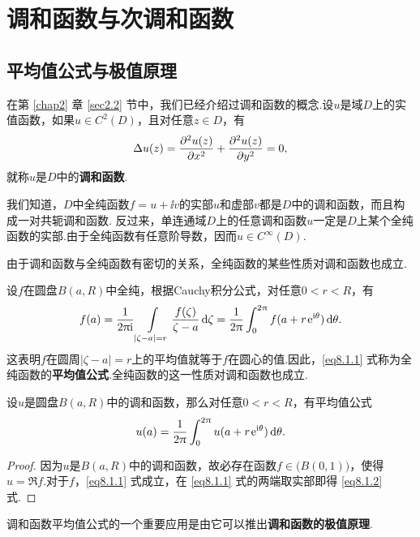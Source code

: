 \chapter{调和函数与次调和函数\label{chap8}}
\section{平均值公式与极值原理\label{sec8.1}}
在第 \ref{chap2} 章 \ref{sec2.2} 节中，我们已经介绍过调和函数的概念.设$u$是域$D$上的实值函数，如果$u\in C^2(D)$，且对任意$z\in D$，有
\[
  \Delta u(z) = \frac{\partial^2 u(z)}{\partial x^2} + \frac{\partial^2 u(z)}{\partial y^2} = 0,
\]
就称$u$是$D$中的\textbf{调和函数}.

我们知道，$D$中全纯函数$f=u+\ii v$的实部$u$和虚部$v$都是$D$中的调和函数，而且构成一对共轭调和函数. 反过来，单连通域$D$上的任意调和函数$u$一定是$D$上某个全纯函数的实部.由于全纯函数有任意阶导数，因而$u\in C^\infty(D)$.

由于调和函数与全纯函数有密切的关系，全纯函数的某些性质对调和函数也成立.

设$f$在圆盘$B(a,R)$中全纯，根据Cauchy积分公式，对任意$0<r<R$，有
\begin{equation}\label{eq8.1.1}
  f(a) = \frac1{2\uppi\mathrm i}\int\limits_{|\zeta-a|=r}\frac{f(\zeta)}{\zeta-a}\mathop{}\!\mathrm{d} \zeta
  = \frac1{2\uppi}\int_0^{2\uppi}f(a+r\operatorname{\!\!\;\mathrm e}^{\mathrm i\theta})\mathop{}\!\mathrm{d} \theta.
\end{equation}
这表明$f$在圆周$|\zeta-a|=r$上的平均值就等于$f$在圆心的值.因此，\eqref{eq8.1.1} 式称为全纯函数的\textbf{平均值公式}.全纯函数的这一性质对调和函数也成立.

\begin{theorem}\label{thm8.1.1}
  设$u$是圆盘$B(a,R)$中的调和函数，那么对任意$0<r<R$，有平均值公式
  \begin{equation}\label{eq8.1.2}
    u(a) = \frac1{2\uppi}\int_0^{2\uppi}u(a+r\operatorname{\!\!\;\mathrm e}^{\mathrm i\theta})\mathop{}\!\mathrm{d} \theta.
  \end{equation}
\end{theorem}
\begin{proof}
  因为$u$是$B(a,R)$中的调和函数，故必存在函数$f\in\big(B(0,1)\big)$，使得$u=\Re f$.对于$f$，\eqref{eq8.1.1} 式成立，在 \eqref{eq8.1.1} 式的两端取实部即得 \eqref{eq8.1.2} 式.
\end{proof}

调和函数平均值公式的一个重要应用是由它可以推出\textbf{调和函数的极值原理}.

